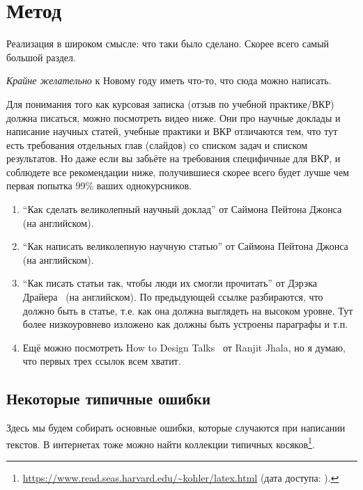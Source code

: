 
\section{Метод}
Реализация в широком смысле: что таки было сделано. Скорее всего самый большой раздел.

\emph{Крайне желательно} к Новому году иметь что-то, что сюда можно написать.

Для понимания того как курсовая записка (отзыв по учебной практи\-ке/ВКР) должна писаться, можно посмотреть видео ниже. Они про научные доклады и написание научных статей, учебные практики и ВКР отличаются тем, что тут есть требования отдельных глав (слайдов) со списком задач и списком результатов. Но даже если вы забьёте на требования специфичные для ВКР, и соблюдете все рекомендации ниже, получившиеся скорее всего будет лучше чем первая попытка 99\% ваших однокурсников.

\begin{enumerate}
\item \enquote{Как сделать великолепный научный доклад} от Саймона Пейтона Джонса~\cite{SPJGreatTalk} (на английском).
\item \enquote{Как написать великолепную научную статью} от Саймона Пейтона Джонса~\cite{SPJGreatPaper} (на английском).
\item \enquote{Как писать статьи так, чтобы люди их смогли прочитать} от Дэрэка Драйера~\cite{DreyerYoutube2020} (на английском). По предыдующей ссылке разбираются, что должно быть в статье, т.е. как она должна выгля\-деть на высоком уровне. Тут более низкоуровнево изложено как должны быть устроены параграфы и т.п.
\item Ещё можно посмотреть How to Design Talks~\cite{JhalaYoutube2020} от Ranjit Jhala, но я думаю, что первых трех ссылок всем хватит.
\end{enumerate}


\subsection{Некоторые типичные ошибки}
Здесь мы будем собирать основные ошибки, которые случаются при написании текстов.
В интернетах тоже можно найти коллекции типич\-ных косяков\footnote{\href{https://www.read.seas.harvard.edu/~kohler/latex.html}{https://www.read.seas.harvard.edu/\textasciitilde kohler/latex.html} (дата доступа:   ).}.

